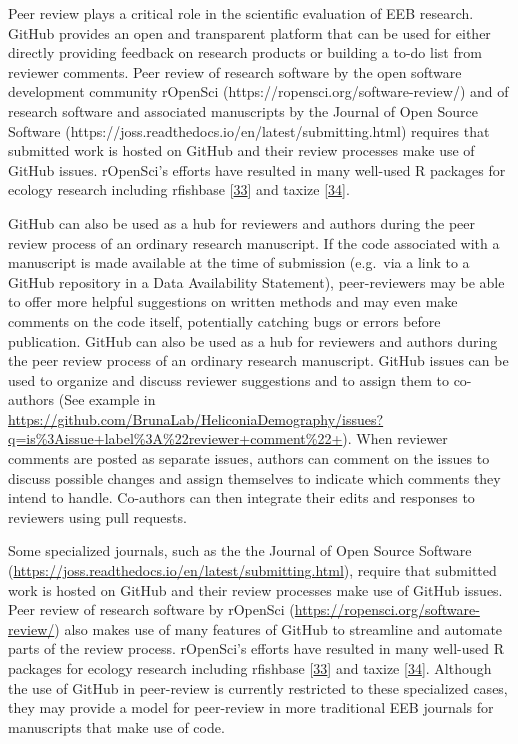 Peer review plays a critical role in the scientific evaluation of EEB research.
GitHub provides an open and transparent platform that can be used for either directly providing feedback on research products or building a to-do list from reviewer comments.
Peer review of research software by the open software development community rOpenSci (https://ropensci.org/software-review/) and of research software and associated manuscripts by the Journal of Open Source Software (https://joss.readthedocs.io/en/latest/submitting.html) requires that submitted work is hosted on GitHub and their review processes make use of GitHub issues.
rOpenSci's efforts have resulted in many well-used R packages for ecology research including rfishbase {[}\protect\hyperlink{ref-Xsdcv6q}{33}{]} and taxize {[}\protect\hyperlink{ref-FVBWKkZu}{34}{]}.

GitHub can also be used as a hub for reviewers and authors during the peer review process of an ordinary research manuscript.
If the code associated with a manuscript is made available at the time of submission (e.g.~via a link to a GitHub repository in a Data Availability Statement), peer-reviewers may be able to offer more helpful suggestions on written methods and may even make comments on the code itself, potentially catching bugs or errors before publication.
GitHub can also be used as a hub for reviewers and authors during the peer review process of an ordinary research manuscript.
GitHub issues can be used to organize and discuss reviewer suggestions and to assign them to co-authors (See example in \url{https://github.com/BrunaLab/HeliconiaDemography/issues?q=is\%3Aissue+label\%3A\%22reviewer+comment\%22+}).
When reviewer comments are posted as separate issues, authors can comment on the issues to discuss possible changes and assign themselves to indicate which comments they intend to handle.
Co-authors can then integrate their edits and responses to reviewers using pull requests.

Some specialized journals, such as the the Journal of Open Source Software (\url{https://joss.readthedocs.io/en/latest/submitting.html}), require that submitted work is hosted on GitHub and their review processes make use of GitHub issues.
Peer review of research software by rOpenSci (\url{https://ropensci.org/software-review/}) also makes use of many features of GitHub to streamline and automate parts of the review process.
rOpenSci's efforts have resulted in many well-used R packages for ecology research including rfishbase {[}\protect\hyperlink{ref-Xsdcv6q}{33}{]} and taxize {[}\protect\hyperlink{ref-FVBWKkZu}{34}{]}.
Although the use of GitHub in peer-review is currently restricted to these specialized cases, they may provide a model for peer-review in more traditional EEB journals for manuscripts that make use of code.

